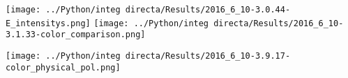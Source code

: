 	\begin{minipage}{0.5\textwidth}
		
		\centering
		\texttt{[image: ../Python/integ directa/Results/2016\_6\_10-3.0.44-E\_intensitys.png]}
		\texttt{[image: ../Python/integ directa/Results/2016\_6\_10-3.1.33-color\_comparison.png]}
		
	\end{minipage}
	\begin{minipage}{0.5\textwidth}
		
		\centering
		\texttt{[image: ../Python/integ directa/Results/2016\_6\_10-3.9.17-color\_physical\_pol.png]}
		
	\end{minipage}